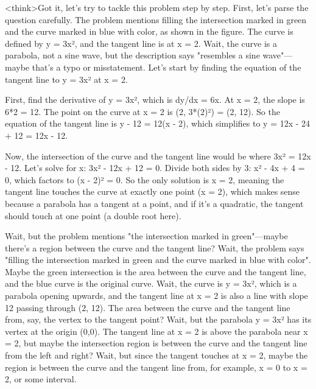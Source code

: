 <think>Got it, let's try to tackle this problem step by step. First, let's parse the question carefully. The problem mentions filling the intersection marked in green and the curve marked in blue with color, as shown in the figure. The curve is defined by y = 3x², and the tangent line is at x = 2. Wait, the curve is a parabola, not a sine wave, but the description says "resembles a sine wave"—maybe that's a typo or misstatement. Let's start by finding the equation of the tangent line to y = 3x² at x = 2.

First, find the derivative of y = 3x², which is dy/dx = 6x. At x = 2, the slope is 6*2 = 12. The point on the curve at x = 2 is (2, 3*(2)²) = (2, 12). So the equation of the tangent line is y - 12 = 12(x - 2), which simplifies to y = 12x - 24 + 12 = 12x - 12.

Now, the intersection of the curve and the tangent line would be where 3x² = 12x - 12. Let's solve for x: 3x² - 12x + 12 = 0. Divide both sides by 3: x² - 4x + 4 = 0, which factors to (x - 2)² = 0. So the only solution is x = 2, meaning the tangent line touches the curve at exactly one point (x = 2), which makes sense because a parabola has a tangent at a point, and if it's a quadratic, the tangent should touch at one point (a double root here).

Wait, but the problem mentions "the intersection marked in green"—maybe there's a region between the curve and the tangent line? Wait, the problem says "filling the intersection marked in green and the curve marked in blue with color". Maybe the green intersection is the area between the curve and the tangent line, and the blue curve is the original curve. Wait, the curve is y = 3x², which is a parabola opening upwards, and the tangent line at x = 2 is also a line with slope 12 passing through (2, 12). The area between the curve and the tangent line from, say, the vertex to the tangent point? Wait, but the parabola y = 3x² has its vertex at the origin (0,0). The tangent line at x = 2 is above the parabola near x = 2, but maybe the intersection region is between the curve and the tangent line from the left and right? Wait, but since the tangent touches at x = 2, maybe the region is between the curve and the tangent line from, for example, x = 0 to x = 2, or some interval.

